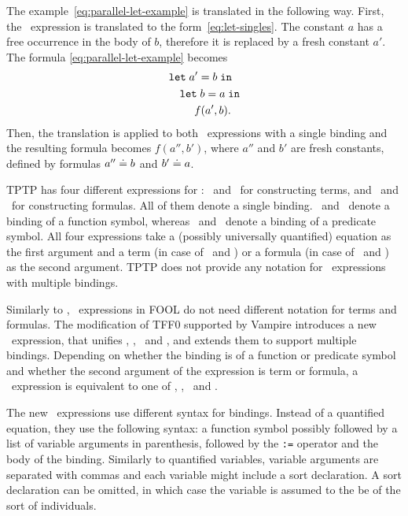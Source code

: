 The example~\eqref{eq:parallel-let-example} is translated in the following way. First, the \LETIN\ expression is translated to the form~\eqref{eq:let-singles}. The constant $a$ has a free occurrence in the body of $b$, therefore it is replaced by a fresh constant $a'$. The formula \eqref{eq:parallel-let-example} becomes
\begin{equation*}
\begin{aligned}
  &\mathtt{let}\;{a'}={b}\;\mathtt{in}\\
  &\quad\mathtt{let}\;{b}={a}\;\mathtt{in}\\
  &\quad\quad\ f(a', b).
\end{aligned}
\end{equation*}
Then, the translation is applied to both \LETIN\ expressions with a single binding and the resulting formula becomes $f(a'', b')$, where $a''$ and $b'$ are fresh constants, defined by formulas $a'' \doteq b$ and $b' \doteq a$.

TPTP has four different expressions for \LETIN: \dlettt\ and \dletft\ for constructing terms, and \dlettf\  and \dletff\  for constructing formulas. All of them denote a single binding. \dlettt\ and \dlettf\ denote a binding of a function symbol, whereas \dletft\ and \dletff\ denote a binding of a predicate symbol. All four expressions take a (possibly universally quantified) equation as the first argument and a term (in case of \dlettt\ and \dletft) or a formula (in case of \dlettf\ and \dletff) as the second argument. TPTP does not provide any notation for \LETIN\  expressions with multiple bindings.

Similarly to \ITE, \LETIN\ expressions in FOOL do not need different notation for terms and formulas. The modification of TFF0 supported by Vampire introduces a new \dlet\ expression, that unifies \dlettt, \dletft, \dlettf\ and \dletff, and extends them to support multiple bindings. Depending on whether the binding is of a function or predicate symbol and whether the second argument of the expression is term or formula, a \dlet\ expression is equivalent to one of \dlettt, \dletft, \dlettf\ and \dletff.

The new \dlet\ expressions use different syntax for bindings. Instead of a quantified equation, they use the following syntax: a function symbol possibly followed by a list of variable arguments in parenthesis, followed by the \lstinline':=' operator and the body of the binding. Similarly to quantified variables, variable arguments are separated with commas and each variable might include a sort declaration. A sort declaration can be omitted, in which case the variable is assumed to the be of the sort of individuals.

